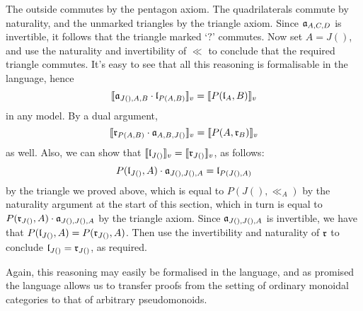 \documentclass{robinthesisdraft}
\begin{document}
The outside commutes by the pentagon axiom.
The quadrilaterals commute by naturality, and the unmarked triangles
by the triangle axiom. Since $\aa_{A,C,D}$ is invertible, it follows
that the triangle marked `$?$' commutes.
Now set $A = J()$, and use the naturality and invertibility of $\ll$ to
conclude that the required triangle commutes.
It's easy to see that all this reasoning is formalisable in the language,
hence
\[
	\semint{\aa_{J(), A, B} \cdot \ll_{P(A,B)}}
	=
	\semint{P(\ll_{A}, B)}
\]
in any model.
By a dual argument,
\[
	\semint{\rr_{P(A,B)} \cdot \aa_{A,B,J()}} = \semint{P(A, \rr_{B})}
\]
as well. Also, we can show that $\semint{\ll_{J()}} = \semint{\rr_{J()}}$,
as follows:
\[
	P(\ll_{J()},A) \cdot \aa_{J(),J(),A} = \ll_{P(J(),A)}
\]
by the triangle we proved above, which is equal to $P(J(), \ll_{A})$
by the naturality argument at the start of this section, which in
turn is equal to $P(\rr_{J()}, A) \cdot \aa_{J(),J(),A}$ by the
triangle axiom. Since $\aa_{J(),J(),A}$ is invertible, we have
that $P(\ll_{J()},A) = P(\rr_{J()}, A)$. Then use the invertibility
and naturality of $\rr$ to conclude $\ll_{J()} = \rr_{J()}$, as
required.

Again, this reasoning may easily be formalised in the language,
and as promised the language allows us to transfer proofs from
the setting of ordinary monoidal categories to that of arbitrary
pseudomonoids.

\end{document}
